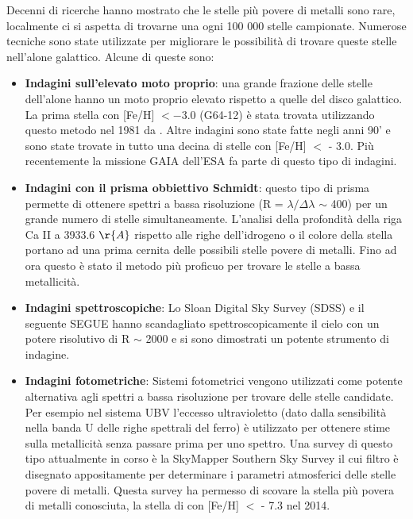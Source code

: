 \documentclass[12pt]{article}
\begin{document}
Decenni di ricerche hanno mostrato che le stelle più povere di metalli sono rare, localmente ci si aspetta di trovarne una ogni 100 000 stelle campionate. Numerose tecniche sono state utilizzate per migliorare le possibilità di trovare queste stelle nell’alone galattico. Alcune di queste sono:
\begin{itemize}
\item \textbf{Indagini sull’elevato moto proprio}: una grande frazione delle stelle dell’alone hanno un moto proprio elevato rispetto a quelle del disco galattico. La prima stella con [Fe/H] $<-3.0$ (G64-12) è stata trovata utilizzando questo metodo nel 1981 da \cite{1981}. Altre indagini sono state fatte negli anni 90’ e sono state trovate in tutto una decina di stelle con [Fe/H] $<$ - 3.0. Più recentemente la missione GAIA dell’ESA fa parte di questo tipo di indagini. 
\item \textbf{Indagini con il prisma obbiettivo Schmidt}: questo tipo di prisma permette di ottenere spettri a bassa risoluzione (R = $\lambda/\Delta\lambda$ $\sim$ 400) per un grande numero di stelle simultaneamente. L’analisi della profondità della riga Ca II a 3933.6 $\r{A}$ rispetto alle righe dell’idrogeno o il colore della stella portano ad una prima cernita delle possibili stelle povere di metalli. Fino ad ora questo è stato il metodo più proficuo per trovare le stelle a bassa metallicità.

\item \textbf{Indagini spettroscopiche}: Lo Sloan Digital Sky Survey (SDSS) e il seguente SEGUE hanno scandagliato spettroscopicamente il cielo con un potere risolutivo di R $\sim$ 2000 e si sono dimostrati un potente strumento di indagine.
\item \textbf{Indagini fotometriche}: Sistemi fotometrici vengono utilizzati come potente alternativa agli spettri a bassa risoluzione per trovare delle stelle candidate. Per esempio nel sistema UBV l’eccesso ultravioletto (dato dalla sensibilità nella banda U delle righe spettrali del ferro) è utilizzato per ottenere stime sulla metallicità senza passare prima per uno spettro. Una survey di questo tipo attualmente in corso è la SkyMapper Southern Sky Survey il cui filtro è disegnato appositamente per determinare i parametri atmosferici delle stelle povere di metalli. Questa survey ha permesso di scovare la stella più povera di metalli conosciuta, la stella di \cite{keller} con [Fe/H] $<$ - 7.3 nel 2014.


\end{itemize}
\end{document}
